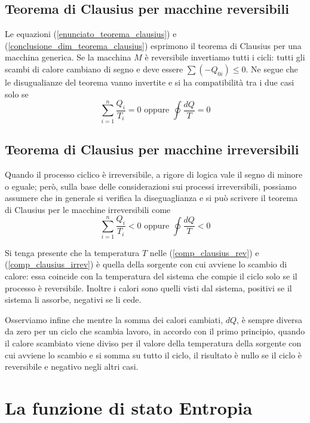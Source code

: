 \documentclass[class=book, crop=false, oneside, 12pt]{standalone}
\begin{document}
\subsection{Teorema di Clausius per macchine reversibili}

Le equazioni (\ref{enunciato_teorema_clausius}) e (\ref{conclusione_dim_teorema_clausius}) esprimono il teorema di Clausius per una macchina generica.
Se la macchina \(M\) è reversibile invertiamo tutti i cicli: tutti gli scambi di calore cambiano di segno e deve essere \(\sum \left(-Q_{0i}\right) \leq 0\). 
Ne segue che le disugualianze del teorema vanno invertite e si ha compatibilità tra i due casi solo se 
\begin{equation} \label{comp_clausius_rev}
    \sum_{i = 1}^{n} \frac{Q_i}{T_i} = 0 \text{ oppure } \oint \frac{d Q}{T} = 0
\end{equation}

\subsection{Teorema di Clausius per macchine irreversibili}

Quando il processo ciclico è irreversibile, a rigore di logica vale il segno di minore o eguale; 
però, sulla base delle considerazioni sui processi irreversibili, possiamo assumere che in generale si verifica la diseguaglianza e si può scrivere il teorema di Clausius per le macchine irreversibili come
\begin{equation} \label{comp_clausius_irrev}
    \sum_{i = 1}^{n} \frac{Q_i}{T_i} < 0 \text{ oppure } \oint \frac{d Q}{T} < 0
\end{equation} 

Si tenga presente che la temperatura \(T\) nelle (\ref{comp_clausius_rev}) e (\ref{comp_clausius_irrev}) è quella della sorgente con cui avviene lo scambio di calore: essa coincide con la temperatura del sistema che compie il ciclo solo se il processo è reversibile. 
Inoltre i calori sono quelli visti dal sistema, positivi se il sistema li assorbe, negativi se li cede.

Osserviamo infine che mentre la somma dei calori cambiati, \(d Q\), è sempre diversa da zero per un ciclo che scambia lavoro, in accordo con il primo principio, quando il calore scambiato viene diviso per il valore della temperatura della sorgente con cui avviene lo scambio e si somma su tutto il ciclo, il risultato è nullo se il ciclo è reversibile e negativo negli altri casi. 

\section{La funzione di stato Entropia}
\end{document}
